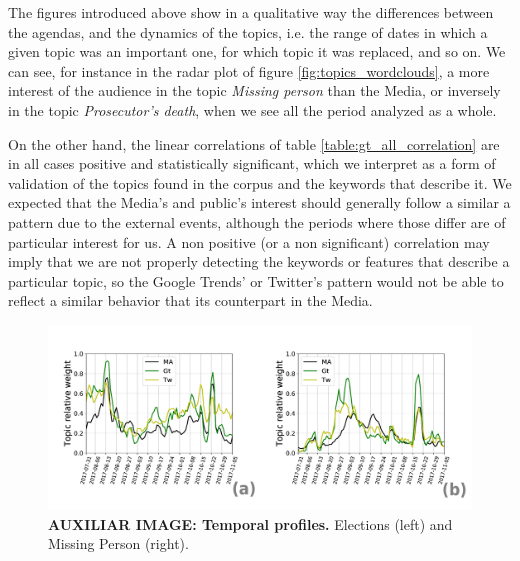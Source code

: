 

\par The figures introduced above show in a qualitative way the differences between the agendas, and the dynamics of the topics, i.e. the range of dates in which a given topic was an important one, for which topic it was replaced, and so on. We can see, for instance in the radar plot of figure \ref{fig:topics_wordclouds}, a more interest of the audience in the topic \emph{Missing person} than the Media, or inversely in the topic \emph{Prosecutor's death}, when we see all the period analyzed as a whole. 
\par On the other hand, the linear correlations of table \ref{table:gt_all_correlation} are in all cases positive and statistically significant, which we interpret as a form of validation of the topics found in the corpus and the keywords that describe it. 
We expected that the Media's and public's interest should generally follow a similar a pattern due to the external events, although the periods where those differ are of particular interest for us. 
A non positive (or a non significant) correlation may imply that we are not properly detecting the keywords or features that describe a particular topic, so the Google Trends' or Twitter's pattern would not be able to reflect a similar behavior that its counterpart in the Media.

\begin{figure}[h]
\centering
\includegraphics[width = \textwidth]{images/Fig2_5.pdf}
\caption{\textbf{AUXILIAR IMAGE: Temporal profiles.}
Elections (left) and Missing Person (right).
}
\end{figure}

